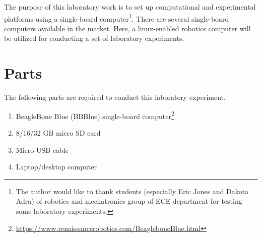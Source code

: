 
The purpose of this laboratory work is to set up computational and experimental platforms using a single-board computer\footnote{The author would like to thank students (especially Eric Jones and Dakota Adra) of robotics and mechatronics group of ECE department for testing some laboratory experiments.}. There are several single-board computers available in the market. Here, a linux-enabled robotics computer will be utilized for conducting a set of laboratory experiments.

\section{Parts}
\label{sec:partsNeeded}
The following parts are required to conduct this laboratory experiment. %
%
\begin{enumerate}
\item BeagleBone Blue (BBBlue) single-board computer\footnote{\href{https://www.renaissancerobotics.com/BeagleboneBlue.html}{https://www.renaissancerobotics.com/BeagleboneBlue.html}}
\item 8/16/32 GB micro SD card
\item Micro-USB cable 
\item Laptop/desktop computer 
\end{enumerate}


